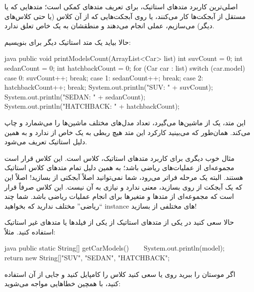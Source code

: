 اصلی‌ترین کاربرد متدهای استاتیک، برای تعریف متدهای کمکی است؛ متدهایی که
یا مستقل از آبجکت‌ها کار می‌کنند، یا روی آبجکت‌هایی که از آن کلاس (یا حتی
کلاس‌های دیگر) می‌سازیم، عملی انجام می‌دهند و منطقشان به یک 
خاص تعلق ندارد.

حالا بیاید یک متد استاتیک دیگر برای  بنویسیم:

\begin{codebox}{java}
public void printModelsCount(ArrayList<Car> list) {
    int suvCount = 0;
    int sedanCount = 0;
    int hatchbackCount = 0;
    for (Car car : list) {
        switch (car.model) {
            case 0:  
                suvCount++;
                break;
            case 1:  
                sedanCount++;
                break;
            case 2:
                hatchbackCount++;
                break;  
        }  
    }
    System.out.println("SUV: " + suvCount);
    System.out.println("SEDAN: " + sedanCount);
    System.out.println("HATCHBACK: " + hatchbackCount);  
}
\end{codebox}

این متد، یک  از ماشین‌ها می‌گیرد، تعداد مدل‌های مختلف ماشین‌ها
را می‌شمارد و چاپ می‌کند. همان‌طور که می‌بینید کارکرد این متد هیچ ربطی به یک
 خاص از  ندارد و به همین دلیل استاتیک
تعریف می‌شود.

مثال خوب دیگری برای کاربرد متدهای استاتیک، کلاس  است.
این کلاس قرار است مجموعه‌ای از عملیات‌های ریاضی باشد؛ به همین دلیل تمام
متد‌های کلاس  استاتیک هستند. البته 
یک مرحله فراتر می‌رود، شما نمی‌توانید اصلاً آبجکتی از 
بسازید! اصلاً این که یک آبجکت از روی  بسازید، معنی
ندارد و نیازی به آن نیست. این کلاس صرفاً قرار است که مجموعه‌ای از متدها و
متغیرها برای انجام عملیات ریاضی باشد. شما چند ``ریاضی'' مختلف ندارید که
بخواهید instance‌ های مختلفی از  بسازید!

حالا سعی کنید در یکی از متدهای استاتیک  از یکی از
فیلدها یا متدهای غیر استاتیک  استفاده کنید. مثلاً:

\begin{codebox}{java}
public static String[] getCarModels() {  
    System.out.println(model);
    return new String[]{"SUV", "SEDAN", "HATCHBACK"};  
}
\end{codebox}

اگر موستان را ببرید روی  یا سعی کنید کلاس
 را کامپایل کنید و جایی از آن استفاده کنید، با همچین
خطاهایی مواجه می‌\-شوید:

